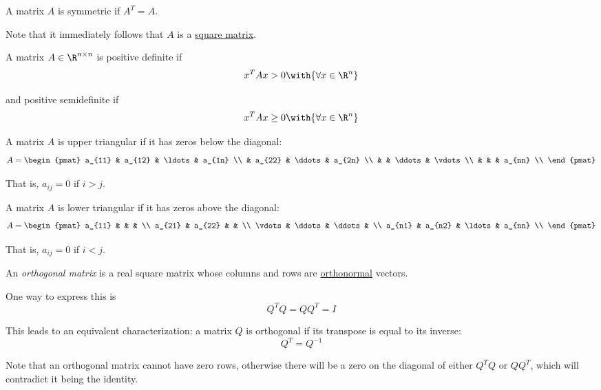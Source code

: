 A matrix $A$ is symmetric if $A^T=A$.

Note that it immediately follows that $A$ is a \href{d917f93}{square matrix}.

\label{e25e722}

A matrix $A\in\R^{n\times n}$ is positive definite if
$$
  x^TAx>0\with{\forall x\in\R^n}
$$

and positive semidefinite if
$$
  x^TAx\geq0\with{\forall x\in\R^n}
$$

\label{c39b6bf}

A matrix $A$ is upper triangular if it has zeros below the diagonal:
$$
  A=\begin{pmat}
    a_{11} & a_{12} & \ldots & a_{1n} \\
           & a_{22} & \ddots & a_{2n} \\
           &        & \ddots & \vdots \\
           &        &        & a_{nn} \\
  \end{pmat}
$$

That is, $a_{ij}=0$ if $i>j$.

\label{ce94591}

A matrix $A$ is lower triangular if it has zeros above the diagonal:
$$
  A=\begin{pmat}
    a_{11} &        &        &        \\
    a_{21} & a_{22} &        &        \\
    \vdots & \ddots & \ddots &        \\
    a_{n1} & a_{n2} & \ldots & a_{nn} \\
  \end{pmat}
$$

That is, $a_{ij}=0$ if $i<j$.

\label{c38c9d1}

An \textit{orthogonal matrix} is a real square matrix whose columns and rows
are \href{d90fcb1}{orthonormal} vectors.

One way to express this is
$$
  Q^TQ=QQ^T=I
$$

This leads to an equivalent characterization: a matrix $Q$ is orthogonal if its
transpose is equal to its inverse:
$$
  Q^T=Q^{-1}
$$

Note that an orthogonal matrix cannot have zero rows, otherwise there will be a
zero on the diagonal of either $Q^TQ$ or $QQ^T$, which will contradict it being
the identity.

